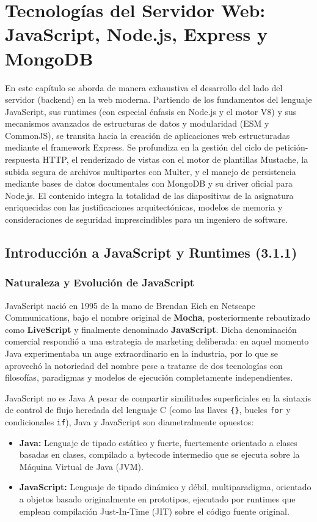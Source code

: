 \chapter{Tecnologías del Servidor Web: JavaScript, Node.js, Express y MongoDB}
\label{cap:tema3}

En este capítulo se aborda de manera exhaustiva el desarrollo del lado del servidor (backend) en la web moderna. Partiendo de los fundamentos del lenguaje JavaScript, sus runtimes (con especial énfasis en Node.js y el motor V8) y sus mecanismos avanzados de estructuras de datos y modularidad (ESM y CommonJS), se transita hacia la creación de aplicaciones web estructuradas mediante el framework Express. Se profundiza en la gestión del ciclo de petición-respuesta HTTP, el renderizado de vistas con el motor de plantillas Mustache, la subida segura de archivos multipartes con Multer, y el manejo de persistencia mediante bases de datos documentales con MongoDB y su driver oficial para Node.js. El contenido integra la totalidad de las diapositivas de la asignatura enriquecidas con las justificaciones arquitectónicas, modelos de memoria y consideraciones de seguridad imprescindibles para un ingeniero de software.

\section{Introducción a JavaScript y Runtimes (3.1.1)}

\subsection{Naturaleza y Evolución de JavaScript}

JavaScript nació en 1995 de la mano de Brendan Eich en Netscape Communications, bajo el nombre original de \textbf{Mocha}, posteriormente rebautizado como \textbf{LiveScript} y finalmente denominado \textbf{JavaScript}. Dicha denominación comercial respondió a una estrategia de marketing deliberada: en aquel momento Java experimentaba un auge extraordinario en la industria, por lo que se aprovechó la notoriedad del nombre pese a tratarse de dos tecnologías con filosofías, paradigmas y modelos de ejecución completamente independientes.

\begin{importante}{JavaScript no es Java}
A pesar de compartir similitudes superficiales en la sintaxis de control de flujo heredada del lenguaje C (como las llaves \texttt{\{\}}, bucles \texttt{for} y condicionales \texttt{if}), Java y JavaScript son diametralmente opuestos:
\begin{itemize}
    \item \textbf{Java:} Lenguaje de tipado estático y fuerte, fuertemente orientado a clases basadas en clases, compilado a bytecode intermedio que se ejecuta sobre la Máquina Virtual de Java (JVM).
    \item \textbf{JavaScript:} Lenguaje de tipado dinámico y débil, multiparadigma, orientado a objetos basado originalmente en prototipos, ejecutado por runtimes que emplean compilación Just-In-Time (JIT) sobre el código fuente original.
\end{itemize}
\end{importante}

